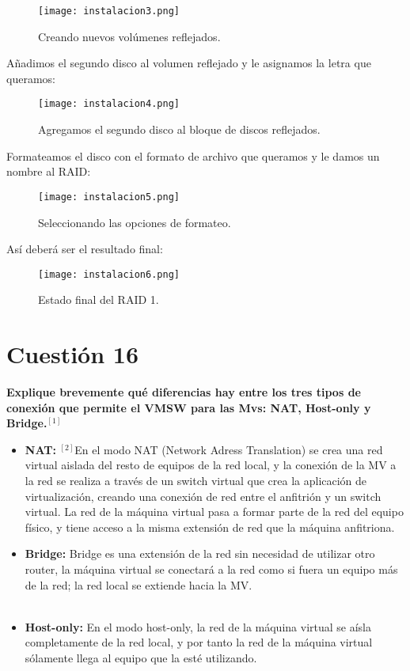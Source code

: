 \documentclass[a4paper, 11pt]{article} %
\begin{document}
\begin{figure}[h]
\centering 
\texttt{[image: instalacion3.png]} 
\caption{Creando nuevos volúmenes reflejados.} 
\label{contexto:figura} 
\end{figure}

\pagebreak
Añadimos el segundo disco al volumen reflejado y le asignamos la letra que queramos: 

\begin{figure}[h]
\centering 
\texttt{[image: instalacion4.png]} 
\caption{Agregamos el segundo disco al bloque de discos reflejados.} 
\vspace{-0.2cm}
\label{contexto:figura} 
\end{figure}

\pagebreak
Formateamos el disco con el formato de archivo que queramos y le damos un nombre al RAID:

\begin{figure}[h]
\centering 
\texttt{[image: instalacion5.png]} 
\caption{Seleccionando las opciones de formateo.}
\vspace{-0.2cm} 
\label{contexto:figura} 
\end{figure}

\pagebreak
Así deberá ser el resultado final:

\begin{figure}[h]
\centering 
\texttt{[image: instalacion6.png]} 
\caption{Estado final del RAID 1.}
\vspace{-0.2cm} 
\label{contexto:figura} 
\end{figure}

\section{Cuestión 16}
\textbf{Explique brevemente qué diferencias hay entre los tres tipos de conexión que permite el VMSW para las Mvs: NAT, Host-only y Bridge.$^{[1]}$}
\begin{itemize}
\item \textbf{NAT: } $^{[2]}$En el modo NAT (Network Adress Translation) se crea una red virtual aislada del resto de equipos de la red local, y la conexión de la MV a la red se realiza a través de un switch virtual que crea la aplicación de virtualización, creando una conexión de red entre el anfitrión y un switch virtual. La red de la máquina virtual pasa a formar parte de la red del equipo físico, y tiene acceso a la misma extensión de red que la máquina anfitriona.
\item \textbf{Bridge: }Bridge es una extensión de la red sin necesidad de utilizar otro router, la máquina virtual se conectará a la red como si fuera un equipo más de la red; la red local se extiende hacia la MV. \\ \\
\item \textbf{Host-only: }En el modo host-only, la red de la máquina virtual se aísla completamente de la red local, y por tanto la red de la máquina virtual sólamente llega al equipo que la esté utilizando.
\end{itemize}
\end{document}
